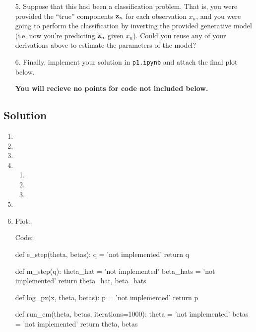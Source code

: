 \documentclass[submit]{harvardml}
\begin{document}
\begin{framed}
\begin{enumerate}
\item[5.] Suppose that this had been a classification problem. That is,
  you were provided the ``true'' components $\mathbf{z}_n$ for each
  observation $x_n$,
  and you were going to perform the classification by
  inverting the provided generative model (i.e. now you're predicting $\mathbf{z}_n$ given $x_n$). Could you reuse any of
  your derivations above to estimate the parameters of the model?
  

\item[6.] Finally, implement your solution in \texttt{p1.ipynb} and attach the final plot below.

{\bfseries You will recieve no points for code not included below.}
\end{enumerate}
  
\end{framed}

\newpage
\subsection*{Solution}

\begin{enumerate}
  \item
  \item 
  \item 
  \item 
    \begin{enumerate}
      \item 
      \item 
      \item 
    \end{enumerate}
  \item 
  \item 
    Plot:


    Code:

    \begin{python}
def e_step(theta, betas):
    q = 'not implemented'
    return q


def m_step(q):
    theta_hat = 'not implemented'
    beta_hats = 'not implemented'
    return theta_hat, beta_hats


def log_px(x, theta, betas):
    p = 'not implemented'
    return p


def run_em(theta, betas, iterations=1000):
    theta = 'not implemented'
    betas = 'not implemented'
    return theta, betas
    \end{python}
\end{enumerate}
\end{document}

